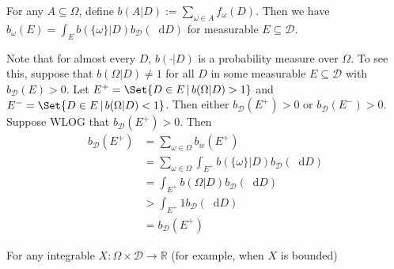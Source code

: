 \documentclass[a4paper]{article}
\newcommand\Exp{\mathsf{Exp}}
\newcommand{\D}{\mathcal{D}}
\newcommand{\Decs}{\mathcal{D}}
\renewcommand{\Re}{\mathbb{R}}
\renewcommand{\color}[1]{}
\newenvironment{colored}[1]{\leavevmode\color{#1}}{}
\newcommand\SetDelimiter[1][]{
	\nonscript\,#1\vert \allowbreak \nonscript\,\mathopen{}}
\providecommand\given{\SetDelimiter}
\newcommand*\diff{\mathop{}\!\mathrm{d}}
\newenvironment{CCM rewritten}
{\begingroup\color{blue}} %
{\endgroup}              %
\begin{document}
\begin{colored}{violet}
\begin{colored}{red}
For any $A\subseteq\Omega$, define $b(A | D):= \sum_{\omega\in A}f_\omega(D)$. Then we have $b_\omega(E)=\int_{E}b(\{\omega\} |D) b_\D(\diff D)$ for measurable $E\subseteq \Decs$. 



Note that for almost every $D$, $b(\cdot |D)$ is a probability measure over $\Omega$. To see this, suppose that $b(\Omega | D)\not=1$ for all $D$ in some measurable $E\subseteq\Decs$ with $b_\D(E)>0$. Let $E^+=\Set{D\in E\given b(\Omega | D)>1}$ and $E^-=\Set{D\in E\given b(\Omega | D)<1}$. Then either $b_\D(E^+)>0$ or $b_\D(E^-)>0$. Suppose WLOG that $b_\D(E^+)>0$. Then
\begin{align}
	b_\D(E^+)&=\sum_{\omega\in\Omega} b_w(E^+)\\
	&=\sum_{\omega\in\Omega}\int_{E^+}b(\{\omega\} |D) b_\D(\diff D)\\
	&=\int_{E^+}b(\Omega |D) b_\D(\diff D)\\
	&>\int_{E^+} 1 b_\D(\diff D)\\
	&=b_\D(E^+)
\end{align}





For any integrable $X: \Omega\times \Decs\to\Re$ (for example, when $X$ is bounded)




\end{colored}
\end{colored}
\end{document}
